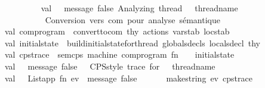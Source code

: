 \begin{isabellebody}
\ \ \ \ \ \ \ \ \isanewline
\ \ \ \ \ \ \ \ val\ {\isacharunderscore}{\kern0pt}\ {\isacharequal}{\kern0pt}\ message\ false\ {\isacharparenleft}{\kern0pt}{\isachardoublequote}{\kern0pt}Analyzing\ thread{\isacharcolon}{\kern0pt}\ {\isachardoublequote}{\kern0pt}\ {\isacharcircum}{\kern0pt}\ thread{\isacharunderscore}{\kern0pt}name{\isacharparenright}{\kern0pt}\isanewline
\ \ \ \ \ \ \ \ \isanewline
\ \ \ \ \ \ \ \ {\isacharparenleft}{\kern0pt}{\isacharasterisk}{\kern0pt}\ Conversion\ vers\ com\ pour\ analyse\ sémantique\ {\isacharasterisk}{\kern0pt}{\isacharparenright}{\kern0pt}\isanewline
\ \ \ \ \ \ \ \ val\ com{\isacharunderscore}{\kern0pt}program\ {\isacharequal}{\kern0pt}\ convert{\isacharunderscore}{\kern0pt}to{\isacharunderscore}{\kern0pt}com\ thy\ actions\ varstab\ locstab\isanewline
\isanewline
\ \ \ \ \ \ \ \ val\ initial{\isacharunderscore}{\kern0pt}state\ {\isacharequal}{\kern0pt}\ build{\isacharunderscore}{\kern0pt}initial{\isacharunderscore}{\kern0pt}state{\isacharunderscore}{\kern0pt}for{\isacharunderscore}{\kern0pt}thread\ globals{\isacharunderscore}{\kern0pt}decls\ locals{\isacharunderscore}{\kern0pt}decl\ thy\isanewline
\isanewline
\ \ \ \ \ \ \ \ val\ cps{\isacharunderscore}{\kern0pt}trace\ {\isacharequal}{\kern0pt}\ sem{\isacharunderscore}{\kern0pt}cps\ machine\ com{\isacharunderscore}{\kern0pt}program\ {\isacharparenleft}{\kern0pt}fn\ {\isacharunderscore}{\kern0pt}\ {\isacharequal}{\kern0pt}{\isachargreater}{\kern0pt}\ {\isacharbrackleft}{\kern0pt}{\isacharbrackright}{\kern0pt}{\isacharparenright}{\kern0pt}\ initial{\isacharunderscore}{\kern0pt}state\isanewline
\isanewline
\ \ \ \ \ \ \ \ val\ {\isacharunderscore}{\kern0pt}\ {\isacharequal}{\kern0pt}\ message\ false\ {\isacharparenleft}{\kern0pt}{\isachardoublequote}{\kern0pt}\ {\isasymcheckmark}\ CPS{\isacharminus}{\kern0pt}style\ trace\ for\ {\isachardoublequote}{\kern0pt}\ {\isacharcircum}{\kern0pt}\ thread{\isacharunderscore}{\kern0pt}name\ {\isacharcircum}{\kern0pt}\ {\isachardoublequote}{\kern0pt}{\isacharcolon}{\kern0pt}{\isachardoublequote}{\kern0pt}{\isacharparenright}{\kern0pt}\isanewline
\ \ \ \ \ \ \ \ val\ {\isacharunderscore}{\kern0pt}\ {\isacharequal}{\kern0pt}\ List{\isachardot}{\kern0pt}app\ {\isacharparenleft}{\kern0pt}fn\ ev\ {\isacharequal}{\kern0pt}{\isachargreater}{\kern0pt}\ message\ false\ {\isacharparenleft}{\kern0pt}{\isachardoublequote}{\kern0pt}\ \ \ \ {\isachardoublequote}{\kern0pt}\ {\isacharcircum}{\kern0pt}\ {\isacharat}{\kern0pt}{\isacharbraceleft}{\kern0pt}make{\isacharunderscore}{\kern0pt}string{\isacharbraceright}{\kern0pt}\ ev{\isacharparenright}{\kern0pt}{\isacharparenright}{\kern0pt}\ cps{\isacharunderscore}{\kern0pt}trace\isanewline

\end{isabellebody}
